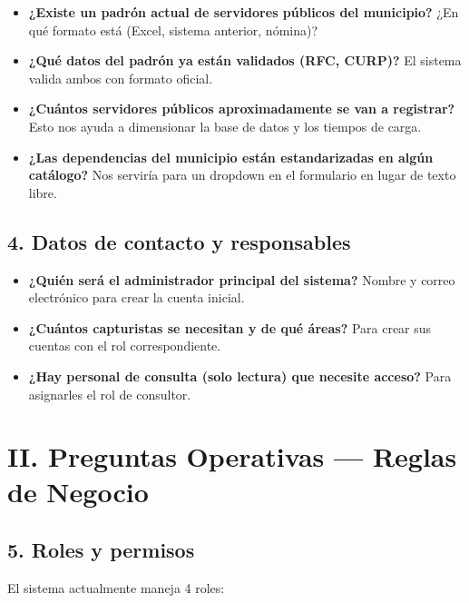 \documentclass[12pt,letterpaper]{article}
\begin{document}
\begin{itemize}
\item \textbf{¿Existe un padrón actual de servidores públicos del municipio?} ¿En qué formato está (Excel, sistema anterior, nómina)?

\item \textbf{¿Qué datos del padrón ya están validados (RFC, CURP)?} El sistema valida ambos con formato oficial.

\item \textbf{¿Cuántos servidores públicos aproximadamente se van a registrar?} Esto nos ayuda a dimensionar la base de datos y los tiempos de carga.

\item \textbf{¿Las dependencias del municipio están estandarizadas en algún catálogo?} Nos serviría para un dropdown en el formulario en lugar de texto libre.
\end{itemize}

\subsection{4. Datos de contacto y responsables}

\begin{itemize}
\item \textbf{¿Quién será el administrador principal del sistema?} Nombre y correo electrónico para crear la cuenta inicial.

\item \textbf{¿Cuántos capturistas se necesitan y de qué áreas?} Para crear sus cuentas con el rol correspondiente.

\item \textbf{¿Hay personal de consulta (solo lectura) que necesite acceso?} Para asignarles el rol de consultor.
\end{itemize}

\newpage

\section{II. Preguntas Operativas --- Reglas de Negocio}

\subsection{5. Roles y permisos}

El sistema actualmente maneja 4 roles:

\vspace{8pt}
\end{document}

